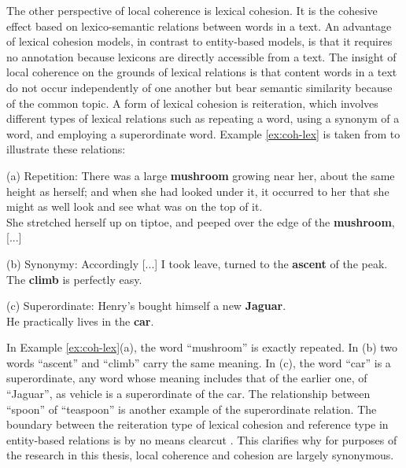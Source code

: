 The other perspective of local coherence is lexical cohesion. 
It is the cohesive effect based on \mbox{lexico-semantic} relations between words in a text. 
An advantage of lexical cohesion models, in contrast to \mbox{entity-based} models, is that it requires no annotation because lexicons are directly accessible from a text. 
The insight of local coherence on the grounds of lexical relations is that content words in a text do not occur independently of one another but bear semantic similarity because of the common topic. 
A form of lexical cohesion is reiteration, which involves different types of lexical relations such as repeating a word, using a synonym of a word, and employing a superordinate word. 
Example \ref{ex:coh-lex} is taken from  to illustrate these relations:

\begin{examples}
	\label{ex:coh-lex}
	(a) Repetition: There was a large \textbf{mushroom} growing near her, about the same height as herself; and when she had looked under it, it occurred to her that she might as well look and see what was on the top of it.\\
	She stretched herself up on tiptoe, and peeped over the edge of the \textbf{mushroom}, [...] 

	(b) Synonymy: Accordingly [...] I took leave, turned to the \textbf{ascent} of the peak. \\
	The \textbf{climb} is perfectly easy. 

	(c) Superordinate: Henry's bought himself a new \textbf{Jaguar}. \\
	He practically lives in the \textbf{car}. 

\end{examples} 

In Example \ref{ex:coh-lex}(a), the word ``mushroom'' is exactly repeated. 
In (b) two words ``ascent'' and ``climb'' carry the same meaning. 
In (c), the word ``car'' is a superordinate, any word whose meaning includes that of the earlier one, of ``Jaguar'', as vehicle is a superordinate of the car. 
The relationship between ``spoon'' of ``teaspoon'' is another example of the superordinate relation. 
The boundary between the reiteration type of lexical cohesion and reference type in entity-based relations is by no means clearcut
\cite{halliday76}. 
This clarifies why for purposes of the research in this thesis, local coherence and cohesion are largely synonymous.

